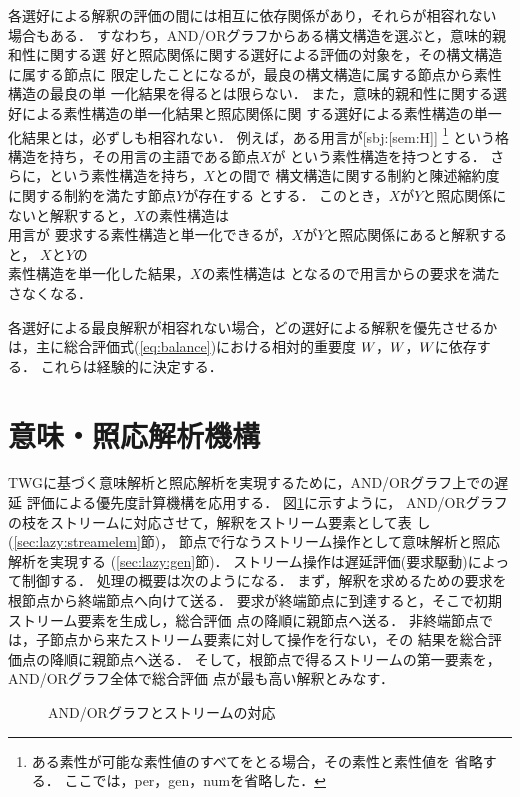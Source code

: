 各選好による解釈の評価の間には相互に依存関係があり，それらが相容れない
場合もある．
すなわち，AND/ORグラフからある構文構造を選ぶと，意味的親和性に関する選
好と照応関係に関する選好による評価の対象を，その構文構造に属する節点に
限定したことになるが，最良の構文構造に属する節点から素性構造の最良の単
一化結果を得るとは限らない．
また，意味的親和性に関する選好による素性構造の単一化結果と照応関係に関
する選好による素性構造の単一化結果とは，必ずしも相容れない．
例えば，ある用言が[sbj:[sem:H]]
\footnote{ある素性が可能な素性値のすべてをとる場合，その素性と素性値を
省略する．
ここでは，per，gen，numを省略した．}
という格構造を持ち，その用言の主語である節点$X$が
という素性構造を持つとする．
さらに，という素性構造を持ち，$X$との間で
構文構造に関する制約と陳述縮約度に関する制約を満たす節点$Y$が存在する
とする．
このとき，$X$が$Y$と照応関係にないと解釈すると，$X$の素性構造は\\用言が
要求する素性構造と単一化できるが，$X$が$Y$と照応関係にあると解釈すると，
$X$と$Y$の\\素性構造を単一化した結果，$X$の素性構造は
となるので用言からの要求を満たさなくなる．

各選好による最良解釈が相容れない場合，どの選好による解釈を優先させるか
は，主に総合評価式(\ref{eq:balance})における相対的重要度
$W_{}$，$W_{}$，$W_{}$に依存する．
これらは経験的に決定する．

\section{意味・照応解析機構}
\label{sec:lazy}

TWGに基づく意味解析と照応解析を実現するために，AND/ORグラフ上での遅延
評価による優先度計算機構\cite{Tamura91,Sugiyama94}を応用する．
図\ref{fig:andorstream}に示すように，
AND/ORグラフの枝をストリームに対応させて，解釈をストリーム要素として表
し(\ref{sec:lazy:streamelem}節)，
節点で行なうストリーム操作として意味解析と照応解析を実現する
(\ref{sec:lazy:gen}節)．
ストリーム操作は遅延評価(要求駆動)によって制御する．
処理の概要は次のようになる．
まず，解釈を求めるための要求を根節点から終端節点へ向けて送る．
要求が終端節点に到達すると，そこで初期ストリーム要素を生成し，総合評価
点の降順に親節点へ送る．
非終端節点では，子節点から来たストリーム要素に対して操作を行ない，その
結果を総合評価点の降順に親節点へ送る．
そして，根節点で得るストリームの第一要素を，AND/ORグラフ全体で総合評価
点が最も高い解釈とみなす．
\begin{figure}[htbp]
\begin{center}
\end{center}
\caption{AND/ORグラフとストリームの対応}
\label{fig:andorstream}
\end{figure}

